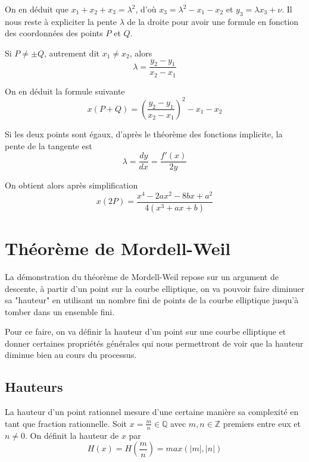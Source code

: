 \documentclass{article}
\begin{document}
On en déduit que $x_{1} + x_{2} + x_{3} = \lambda^2$, d'où $x_{3} = \lambda^2 - x_{1} - x_{2}$
et $y_{3} = \lambda x_{3} + \nu$.
Il nous reste à expliciter la pente $\lambda$ de la droite pour avoir une formule en fonction
des coordonnées des points $P$ et $Q$.

Si $P\neq \pm Q$, autrement dit $x_{1} \neq x_{2}$, alors
\begin{equation*}
\lambda = \frac{y_{2} - y_{1}}{x_{2} - x_{1}}
\end{equation*}

On en déduit la formule suivante
\begin{equation}
\label{P+Q}
x(P+Q) = (\frac{y_{2} - y_{1}}{x_{2} - x_{1}})^2 - x_{1} - x_{2}
\end{equation}

Si les deux points sont égaux, d'après le théorème des fonctions implicite, 
la pente de la tangente est
\begin{equation*}
\lambda = \frac{dy}{dx} = \frac{f'(x)}{2y}
\end{equation*}

On obtient alors après simplification
\begin{equation}
\label{2P}
x(2P) = \frac{x^4 - 2ax^2 - 8bx + a^2}{4(x^3 + ax + b)}
\end{equation}

\section{Théorème de Mordell-Weil}
La démonstration du théorème de Mordell-Weil repose sur un argument de descente, à partir d'un point
sur la courbe elliptique, on va pouvoir faire diminuer sa "hauteur" en utilisant un nombre fini de points de la courbe elliptique jusqu'à tomber dans un ensemble fini.

Pour ce faire, on va définir la hauteur d'un point sur une courbe elliptique et donner certaines propriétés générales qui nous permettront de voir que la hauteur diminue bien au cours du processus.

\subsection{Hauteurs}
La hauteur d'un point rationnel mesure d'une certaine manière sa complexité en tant que fraction rationnelle.
Soit $x=\frac{m}{n}\in \mathbb{Q}$ avec $m,n\in \mathbb{Z}$ premiers entre eux et $n\neq 0$. On définit la hauteur de $x$ par 
\begin{equation*}
H(x) = H(\frac{m}{n}) = max(|m|,|n|)
\end{equation*}
\end{document}
